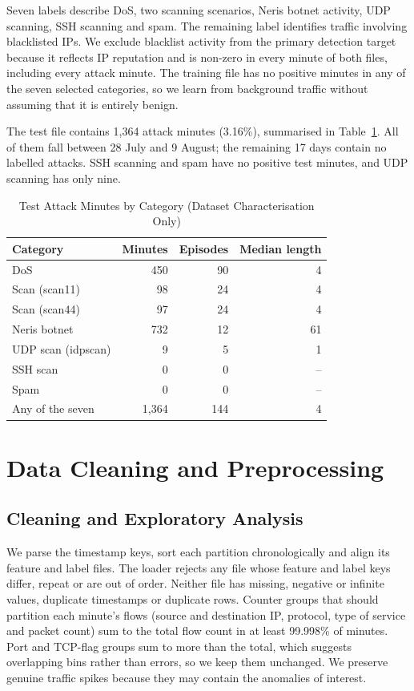 \documentclass[conference]{IEEEtran}
\begin{document}
Seven labels describe DoS, two scanning scenarios, Neris botnet activity, UDP scanning, SSH scanning and spam. The remaining label identifies traffic involving blacklisted IPs. We exclude blacklist activity from the primary detection target because it reflects IP reputation and is non-zero in every minute of both files, including every attack minute. The training file has no positive minutes in any of the seven selected categories, so we learn from background traffic without assuming that it is entirely benign.

The test file contains 1,364 attack minutes (3.16\%), summarised in Table~\ref{tab:categories}. All of them fall between 28 July and 9 August; the remaining 17 days contain no labelled attacks. SSH scanning and spam have no positive test minutes, and UDP scanning has only nine.

\begin{table}[htbp]
\caption{Test Attack Minutes by Category (Dataset Characterisation Only)}
\begin{center}
\begin{tabular}{|l|r|r|r|}
\hline
\textbf{Category} & \textbf{Minutes} & \textbf{Episodes} & \textbf{Median length} \\
\hline
DoS & 450 & 90 & 4 \\
Scan (scan11) & 98 & 24 & 4 \\
Scan (scan44) & 97 & 24 & 4 \\
Neris botnet & 732 & 12 & 61 \\
UDP scan (idpscan) & 9 & 5 & 1 \\
SSH scan & 0 & 0 & -- \\
Spam & 0 & 0 & -- \\
\hline
Any of the seven & 1,364 & 144 & 4 \\
\hline
\end{tabular}
\label{tab:categories}
\end{center}
\end{table}

\section{Data Cleaning and Preprocessing}

\subsection{Cleaning and Exploratory Analysis}
We parse the timestamp keys, sort each partition chronologically and align its feature and label files. The loader rejects any file whose feature and label keys differ, repeat or are out of order. Neither file has missing, negative or infinite values, duplicate timestamps or duplicate rows. Counter groups that should partition each minute's flows (source and destination IP, protocol, type of service and packet count) sum to the total flow count in at least 99.998\% of minutes. Port and TCP-flag groups sum to more than the total, which suggests overlapping bins rather than errors, so we keep them unchanged. We preserve genuine traffic spikes because they may contain the anomalies of interest.
\end{document}

